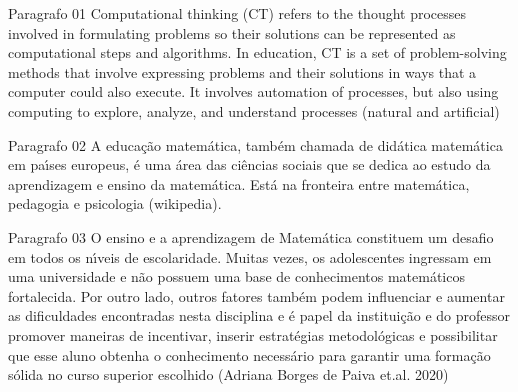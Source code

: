 \documentclass{article}  %
\begin{document}

Paragrafo 01
Computational thinking (CT) refers to the thought processes involved in formulating problems so their solutions can be represented as computational steps and algorithms. In education, CT is a set of problem-solving methods that involve expressing problems and their solutions in ways that a computer could also execute. It involves automation of processes, but also using computing to explore, analyze, and understand processes (natural and artificial)
 
 
 
 
Paragrafo 02
A educa\c{c}\~{a}o matem\'{a}tica, tamb\'{e}m chamada de did\'{a}tica matem\'{a}tica em pa\'{\i}ses europeus, \'{e} uma \'{a}rea das ci\^{e}ncias sociais que se dedica ao estudo da aprendizagem e ensino da matem\'{a}tica. Est\'{a} na fronteira entre matem\'{a}tica, pedagogia e psicologia (wikipedia).





Paragrafo 03
O ensino e a aprendizagem de Matem\'{a}tica constituem um desafio em todos os
n\'{\i}veis de escolaridade. Muitas vezes, os adolescentes ingressam em uma universidade e
n\~{a}o possuem uma base de conhecimentos matem\'{a}ticos fortalecida. Por outro lado,
outros fatores tamb\'{e}m podem influenciar e aumentar as dificuldades encontradas nesta
disciplina e \'{e} papel da institui\c{c}\~{a}o e do professor promover maneiras de incentivar,
inserir estrat\'{e}gias metodol\'{o}gicas e possibilitar que esse aluno obtenha o conhecimento
necess\'{a}rio para garantir uma forma\c{c}\~{a}o s\'{o}lida no curso superior escolhido (Adriana Borges de Paiva et.al. 2020)
\end{document}
